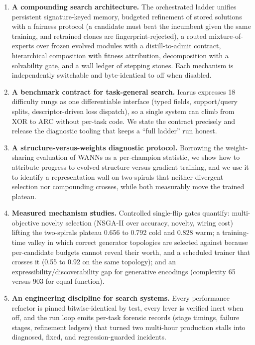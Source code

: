 \documentclass[11pt]{article}
\begin{document}
\begin{enumerate}[leftmargin=*]
\item \textbf{A compounding search architecture.} The orchestrated ladder unifies persistent signature-keyed memory, budgeted refinement of stored solutions with a fairness protocol (a candidate must beat the incumbent given the same training, and retrained clones are fingerprint-rejected), a routed mixture-of-experts over frozen evolved modules with a distill-to-admit contract, hierarchical composition with fitness attribution, decomposition with a solvability gate, and a wall ledger of stepping stones. Each mechanism is independently switchable and byte-identical to off when disabled.
\item \textbf{A benchmark contract for task-general search.} Icarus expresses 18 difficulty rungs as one differentiable interface (typed fields, support/query splits, descriptor-driven loss dispatch), so a single system can climb from XOR to ARC without per-task code. We state the contract precisely and release the diagnostic tooling that keeps a ``full ladder'' run honest.
\item \textbf{A structure-versus-weights diagnostic protocol.} Borrowing the weight-sharing evaluation of WANNs \citep{gaier2019} as a per-champion statistic, we show how to attribute progress to evolved structure versus gradient training, and we use it to identify a representation wall on two-spirals that neither divergent selection nor compounding crosses, while both measurably move the trained plateau.
\item \textbf{Measured mechanism studies.} Controlled single-flip gates quantify: multi-objective novelty selection (NSGA-II over accuracy, novelty, wiring cost) lifting the two-spirals plateau 0.656 to 0.792 cold and 0.828 warm; a training-time valley in which correct generator topologies are selected against because per-candidate budgets cannot reveal their worth, and a scheduled trainer that crosses it (0.55 to 0.92 on the same topology); and an expressibility/discoverability gap for generative encodings (complexity 65 versus 903 for equal function).
\item \textbf{An engineering discipline for search systems.} Every performance refactor is pinned bitwise-identical by test, every lever is verified inert when off, and the run loop emits per-task forensic records (stage timings, failure stages, refinement ledgers) that turned two multi-hour production stalls into diagnosed, fixed, and regression-guarded incidents.
\end{enumerate}
\end{document}
